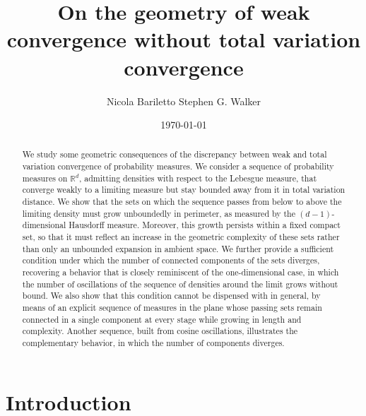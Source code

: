 \documentclass[12pt]{article}
\title{On the geometry of weak convergence without total variation convergence}
\author{Nicola Bariletto \hspace{2cm} Stephen G. Walker}
\affil{The University of Texas at Austin}
\date{\today}
\newcommand{\RR}{\mathbb{R}}
\begin{document}
\maketitle

\begin{abstract}
We study some geometric consequences of the discrepancy between weak and total variation convergence of probability measures. We consider a sequence of probability measures on $\RR^d$, admitting densities with respect to the Lebesgue measure, that converge weakly to a limiting measure but stay bounded away from it in total variation distance. We show that the sets on which the sequence passes from below to above the limiting density must grow unboundedly in perimeter, as measured by the $(d-1)$-dimensional Hausdorff measure. Moreover, this growth persists within a fixed compact set, so that it must reflect an increase in the geometric complexity of these sets rather than only an unbounded expansion in ambient space. We further provide a sufficient condition under which the number of connected components of the sets diverges, recovering a behavior that is closely reminiscent of the one-dimensional case, in which the number of oscillations of the sequence of densities around the limit grows without bound. We also show that this condition cannot be dispensed with in general, by means of an explicit sequence of measures in the plane whose passing sets remain connected in a single component at every stage while growing in length and complexity. Another sequence, built from cosine oscillations, illustrates the complementary behavior, in which the number of components diverges.
\end{abstract}


\section{Introduction}\label{sec:introduction}
\end{document}
